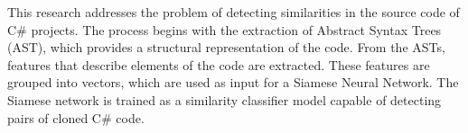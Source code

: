 \begin{abstract}
 Esta investigación aborda el problema de la detección de similitudes en código fuente de proyectos de C\#. El proceso comienza con la extracción del Árboles de Sintaxis Abstracta (AST), lo que permite una representación estructural del código. A partir de los AST, se extraen características que describen elementos del código. Las características se agrupan en vectores que se utilizan como entrada de una Red Neuronal Siamesa. La red siamesa se entrena como un modelo clasificador de similitud capaz de detectar parejas de códigos de C\# clonados.
\end{abstract}

\begin{enabstract}
	This research addresses the problem of detecting similarities in the source code of C\# projects. The process begins with the extraction of Abstract Syntax Trees (AST), which provides a structural representation of the code. From the ASTs, features that describe elements of the code are extracted. These features are grouped into vectors, which are used as input for a Siamese Neural Network. The Siamese network is trained as a similarity classifier model capable of detecting pairs of cloned C\# code.
\end{enabstract}